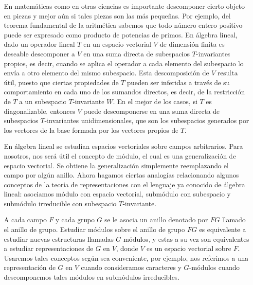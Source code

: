 \documentclass[12pt]{book}
\theoremstyle{definition}
\newcounter{in}
\newcounter{ini}
\begin{document}
En matemáticas como en otras ciencias es importante descomponer cierto
objeto en piezas y mejor aún si tales piezas son las más pequeñas. Por
ejemplo, del teorema fundamental de la aritmética sabemos que todo número
entero positivo puede ser expresado como producto de potencias de
primos. %
En álgebra lineal,
dado un operador lineal $T$ en un espacio vectorial $V$ de
dimensión finita es deseable descomponer a $V$ en una suma directa de
subespacios $T$-invariantes propios, es decir, cuando se aplica el
operador a cada elemento del subespacio lo envía a otro elemento
del mismo subespacio. Esta descomposición de $V$ resulta útil, puesto que ciertas
propiedades de $T$ pueden ser inferidas a través de su comportamiento
en cada uno de los sumandos directos, es decir, de la restricción de
$T$ a un subespacio $T$-invariante $W$.
En el mejor de los casos, si $T$ es diagonalizable, entonces $V$ puede
descomponerse en una suma directa de subespacios $T$-invariantes
unidimensionales, que son los subespacios generados por los vectores
de la base formada por los vectores propios de $T$. 

En álgebra lineal se estudian espacios vectoriales sobre campos
arbitrarios. Para nosotros, nos será útil el concepto de módulo, el cual es una generalización de espacio
vectorial. Se obtiene la generalización simplemente reemplazando el
campo por algún anillo. Ahora hagamos ciertas analogías relacionando
algunos conceptos de la teoría de representaciones con el lenguaje ya
conocido de álgebra lineal: asociamos módulo con espacio vectorial, submódulo con
subespacio y submódulo irreducible con subespacio $T$-invariante.

A cada campo $F$ y cada grupo $G$ se le asocia un anillo denotado por
$FG$ llamado el anillo de grupo. Estudiar módulos sobre el
anillo de grupo $FG$ es equivalente a estudiar nuevas estructuras
llamadas $G$-módulos, y estas a su
vez son equivalentes a estudiar representaciones de $G$ en
$V$, donde $V$ es un espacio vectorial sobre $F$. Usaremos
tales conceptos según sea conveniente, por ejemplo, nos referimos a
una representación de $G$ en $V$ cuando consideramos caracteres y
$G$-módulos cuando descomponemos tales módulos en submódulos
irreducibles. 
\end{document}
